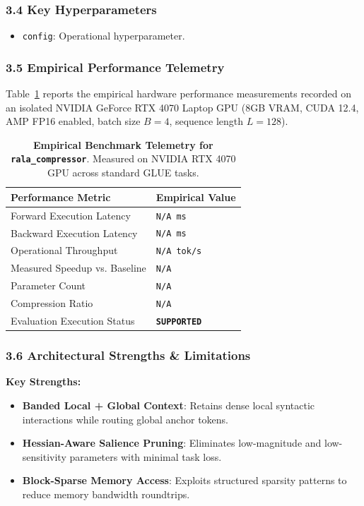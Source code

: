 \subsubsection*{3.4 Key Hyperparameters}
\begin{itemize}
    \item \texttt{config}: Operational hyperparameter.
\end{itemize}

\subsubsection*{3.5 Empirical Performance Telemetry}
Table~\ref{tab:telemetry_rala\_compressor} reports the empirical hardware performance measurements recorded on an isolated NVIDIA GeForce RTX 4070 Laptop GPU (8GB VRAM, CUDA 12.4, AMP FP16 enabled, batch size $B=4$, sequence length $L=128$).

\begin{table}[h]
\centering
\small
\caption{\textbf{Empirical Benchmark Telemetry for \texttt{rala\_compressor}}. Measured on NVIDIA RTX 4070 GPU across standard GLUE tasks.}
\label{tab:telemetry_rala\_compressor}
\begin{tabularx}{\columnwidth}{lX}
\toprule
\textbf{Performance Metric} & \textbf{Empirical Value} \\
\midrule
Forward Execution Latency & \texttt{N/A ms} \\
Backward Execution Latency & \texttt{N/A ms} \\
Operational Throughput & \texttt{N/A tok/s} \\
Measured Speedup vs. Baseline & \texttt{N/A} \\
Parameter Count & \texttt{N/A} \\
Compression Ratio & \texttt{N/A} \\
Evaluation Execution Status & \textbf{\texttt{SUPPORTED}} \\
\bottomrule
\end{tabularx}
\end{table}

\subsubsection*{3.6 Architectural Strengths \& Limitations}
\textbf{Key Strengths:}
\begin{itemize}
    \item \textbf{Banded Local + Global Context}: Retains dense local syntactic interactions while routing global anchor tokens.
    \item \textbf{Hessian-Aware Salience Pruning}: Eliminates low-magnitude and low-sensitivity parameters with minimal task loss.
    \item \textbf{Block-Sparse Memory Access}: Exploits structured sparsity patterns to reduce memory bandwidth roundtrips.
\end{itemize}

